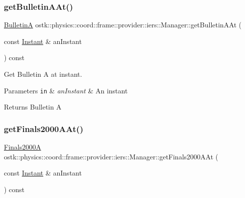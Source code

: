 \subsubsection{\texorpdfstring{get\+Bulletin\+A\+At()}{getBulletinAAt()}}
{\footnotesize\ttfamily \hyperlink{classostk_1_1physics_1_1coord_1_1frame_1_1provider_1_1iers_1_1_bulletin_a}{BulletinA} ostk\+::physics\+::coord\+::frame\+::provider\+::iers\+::\+Manager\+::get\+Bulletin\+A\+At (\begin{DoxyParamCaption}\item[{const \hyperlink{classostk_1_1physics_1_1time_1_1_instant}{Instant} \&}]{an\+Instant }\end{DoxyParamCaption}) const}



Get Bulletin A at instant. 


\begin{DoxyParams}[1]{Parameters}
\mbox{\tt in}  & {\em an\+Instant} & An instant \\
\hline
\end{DoxyParams}
\begin{DoxyReturn}{Returns}
Bulletin A 
\end{DoxyReturn}
\mbox{\label{classostk_1_1physics_1_1coord_1_1frame_1_1provider_1_1iers_1_1_manager_a57081be2537ed82f94729c5954d2c28d}} 
\subsubsection{\texorpdfstring{get\+Finals2000\+A\+At()}{getFinals2000AAt()}}
{\footnotesize\ttfamily \hyperlink{classostk_1_1physics_1_1coord_1_1frame_1_1provider_1_1iers_1_1_finals2000_a}{Finals2000A} ostk\+::physics\+::coord\+::frame\+::provider\+::iers\+::\+Manager\+::get\+Finals2000\+A\+At (\begin{DoxyParamCaption}\item[{const \hyperlink{classostk_1_1physics_1_1time_1_1_instant}{Instant} \&}]{an\+Instant }\end{DoxyParamCaption}) const}



